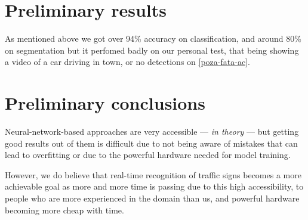 \documentclass[conference]{IEEEtran}
\begin{document}
\section{Preliminary results}

As mentioned above we got over 94\% accuracy on classification, and around 80\%
on segmentation but it perfomed badly on our personal test, that being showing a video of
a car driving in town, or no detections on \ref{poza-fata-ac}.

\section{Preliminary conclusions}

Neural-network-based approaches are very accessible --- \emph{in theory} --- but getting good
results out of them is difficult due to not being aware of mistakes that can lead to overfitting
or due to the powerful hardware needed for model training.

However, we do believe that real-time recognition of traffic signs becomes a more achievable goal
as more and more time is passing due to this high accessibility, to people who are more experienced
in the domain than us, and powerful hardware becoming more cheap with time.



\end{document}
